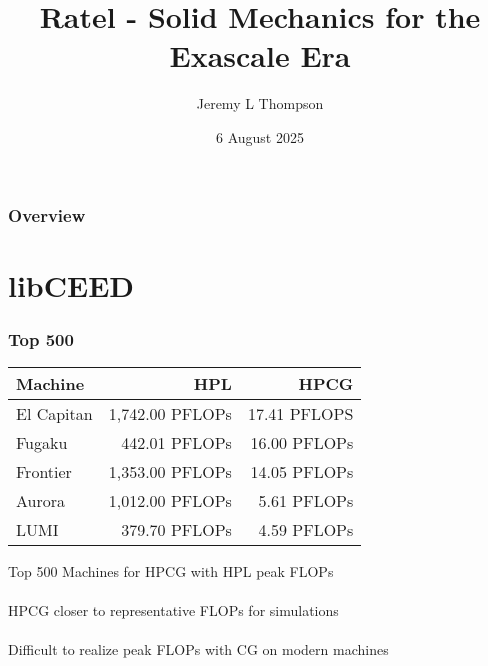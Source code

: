 \documentclass{beamer}
\title[Ratel]{Ratel - Solid Mechanics for the Exascale Era
} %
\author{Jeremy L Thompson} %
\institute[CU Boulder] %
{University of Colorado Boulder \\ %
\medskip
\textit{jeremy@jeremylt.org}\\ %
\textit{Website/CV: \href{https://jeremylt.org}{https://jeremylt.org}}
}
\date{6 August 2025} %
\begin{document}
\begin{frame}
\titlepage %
\end{frame}


\begin{frame}
\frametitle{Overview} %
\tableofcontents %
\end{frame}

\section{libCEED}

\begin{frame}
\begin{center}
\frametitle{Top 500}

\begin{table}[ht!]
\begin{center}
\begin{tabular}{l r r}
  \toprule
  Machine  &  HPL  &  HPCG  \\
  \toprule
  El Capitan &  1,742.00 PFLOPs  &  17.41 PFLOPS  \\
  Fugaku     &    442.01 PFLOPs  &  16.00 PFLOPs  \\
  Frontier   &  1,353.00 PFLOPs  &  14.05 PFLOPs  \\
  Aurora     &  1,012.00 PFLOPs  &   5.61 PFLOPs  \\
  LUMI       &    379.70 PFLOPs  &   4.59 PFLOPs  \\
  \bottomrule
\end{tabular}
\end{center}
\end{table}
{\small Top 500 Machines for HPCG with HPL peak FLOPs}\\

~\\

HPCG closer to representative FLOPs for simulations\\

~\\

Difficult to realize peak FLOPs with CG on modern machines

\end{center}
\end{frame}
\end{document}
